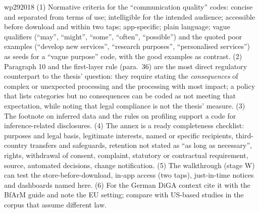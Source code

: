 \begin{papercard}{wp292018}
 (1) Normative criteria for the ``communication quality'' codes: concise and separated from terms of use; intelligible for the intended audience; accessible before download and within two taps; app-specific; plain language; vague qualifiers (``may'', ``might'', ``some'', ``often'', ``possible'') and the quoted poor examples (``develop new services'', ``research purposes'', ``personalised services'') as seeds for a ``vague purpose'' code, with the good examples as contrast. (2) Paragraph 10 and the first-layer rule (para.~36) are the most direct regulatory counterpart to the thesis' question: they require stating the \emph{consequences} of complex or unexpected processing and the processing with most impact; a policy that lists categories but no consequences can be coded as not meeting that expectation, while noting that legal compliance is not the thesis' measure. (3) The footnote on inferred data and the rules on profiling support a code for inference-related disclosures. (4) The annex is a ready completeness checklist: purposes and legal basis, legitimate interests, named or specific recipients, third-country transfers and safeguards, retention not stated as ``as long as necessary'', rights, withdrawal of consent, complaint, statutory or contractual requirement, source, automated decisions, change notification. (5) The walkthrough (stage W) can test the store-before-download, in-app access (two taps), just-in-time notices and dashboards named here. (6) For the German DiGA context cite it with the BfArM guide and note the EU setting; compare with US-based studies in the corpus that assume different law.
\end{papercard}
